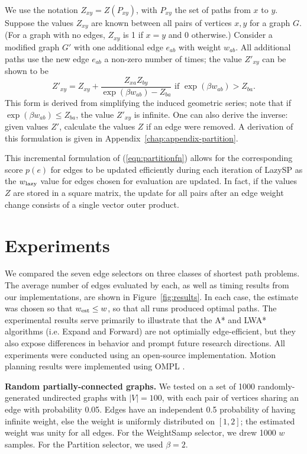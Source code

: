 We use the notation $Z_{xy} = Z(P_{xy})$,
with $P_{xy}$ the set of paths from $x$ to $y$.
Suppose the values $Z_{xy}$ are known between
all pairs of vertices $x, y$ for a graph $G$.
(For a graph with no edges,
$Z_{xy}$ is 1 if $x = y$ and 0 otherwise.)
Consider a modified graph $G'$ with one additional edge $e_{ab}$
with weight $w_{ab}$.
All additional paths use the new edge $e_{ab}$ a non-zero
number of times;
the value $Z'_{xy}$ can be shown to be
\begin{equation}
   Z'_{xy} = Z_{xy} + \frac{Z_{xa} Z_{by}}{\exp(\beta w_{ab}) - Z_{ba}}
   \mbox{ if }
   \exp(\beta w_{ab}) > Z_{ba}.
\end{equation}
This form is derived from simplifying the induced geometric series;
note that if $\exp(\beta w_{ab})  \leq Z_{ba}$,
the value $Z'_{xy}$ is infinite.
One can also derive the inverse:
given values $Z'$,
calculate the values $Z$ if an edge were removed.
A derivation of this formulation is given in
Appendix~\ref{chap:appendix-partition}.

This incremental formulation of (\ref{eqn:partitionfn})
allows for the corresponding score $p(e)$ for edges
to be updated efficiently during each iteration of LazySP as
the $w_{\mbox{\scriptsize lazy}}$ value for edges chosen for evaluation are updated.
In fact,
if the values $Z$ are stored in a square matrix,
the update for all pairs after an edge weight change consists of a single
vector outer product.

\section{Experiments}

We compared the seven edge selectors on three classes of shortest path
problems.
The average number of edges evaluated by each,
as well as timing results from our implementations,
are shown in Figure~\ref{fig:results}.
In each case,
the estimate was chosen so that $w_{\mbox{\scriptsize est}} \leq w$,
so that all runs produced optimal paths.
The experimental results serve primarily to illustrate that
the A* and LWA* algorithms
(i.e. Expand and Forward)
are not optimially edge-efficient,
but they also expose differences in behavior and prompt
future research directions.
All experiments were conducted using an open-source
implementation.
Motion planning results were implemented using
OMPL \citep{sucan2012ompl}.

\textbf{Random partially-connected graphs.}
We tested on a set of 1000 randomly-generated undirected graphs
with $|V|=100$,
with each pair of vertices sharing an edge with probability 0.05.
Edges have an independent 0.5 probability of having infinite weight,
else the weight is uniformly distributed on $[1,2]$;
the estimated weight was unity for all edges.
For the WeightSamp selector,
we drew 1000 $w$ samples.
For the Partition selector, we used $\beta = 2$.

